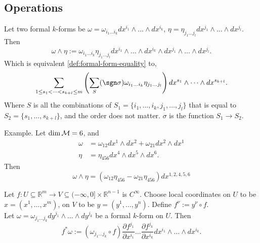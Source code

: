 \documentclass[../main.tex]{subfiles}
\begin{document}
    \subsection{Operations}
    \begin{definition}\label{def:formal-exterior-product}
        Let two formal \(k\)-forms be 
        \(\omega = \omega_{i_1\dots i_k} dx^{i_1} \wedge \dots \wedge dx^{i_k}\), 
        \(\eta = \eta_{j_1\dots j_l} dx^{j_1} \wedge \dots \wedge dx^{j_l}\). Then 
        \[
        \omega\wedge \eta := \omega_{i_1\dots i_k}\eta_{j_1\dots j_l}
        dx^{i_1}\wedge\dots\wedge dx^{i_k} \wedge dx^{j_1} \wedge \dots \wedge 
        dx^{j_l}.
        \]
        Which is equivalent \cref{def:formal-form-equality} to, 
        \[
        \sum_{1 \leq s_1 < \dots < s_{k+l} \leq m}^{} \left(
            \sum_{S}^{} (\sgn\sigma)\omega_{i_1\dots i_k}\eta_{j_1\dots j_l}
        \right)dx^{s_1}\wedge \dots\wedge dx^{s_{k+l}}.
        \]
        Where \(S\) is all the combinations of \(S_1 = \{i_1, \dots, i_k, j_1, \dots, 
        j_l\}\) that is equal to \(S_2 = \{s_1, \dots, s_{k+l}\}\), and the order does 
        not matter. \(\sigma\) is the function \(S_1 \to S_2\).
    \end{definition}
    \begin{remark}
        Example. Let \(\dim \manifold[M]=6\), and 
        \[
        \begin{aligned}
            \omega &= \omega_{12}dx^1\wedge dx^2 + \omega_{21} dx^2 \wedge dx^1 \\
            \eta   &= \eta_{456} dx^4\wedge dx^5\wedge dx^6.
        \end{aligned}
        \]
        Then 
        \[
        \omega\wedge \eta = (\omega_{12}\eta_{456} 
        - \omega_{21}\eta_{456}) dx^{1, 2, 4, 5, 6}
        \]
    \end{remark}
    \begin{definition}[Pullback]\label{def:formal-pullback}
        Let \(f : U \subseteq \mathbb{R}^m \to V \subseteq (-\infty, 0] \times 
        \mathbb{R}^{n-1}\) is \(C^\infty\). Choose local coordinates on 
        \(U\) to be \(x = (x^1, \dots, x^m)\), on \(V\) to be \(y = (y^1, \dots, 
        y^n)\). Define \(f^\nu := y^\nu \circ f\).\\
        Let \(\omega = \omega_{j_1\dots j_k} dy^{j_1}\wedge \dots \wedge dy^{j_k}\) 
        be a formal \(k\)-form on \(U\). Then 
        \[
        f^*\omega := (\omega_{j_1\dots j_k}\circ f)
        \frac{\partial f^{j_1}}{\partial x^{i_1}}\dots
        \frac{\partial f^{j_k}}{\partial x^{i_k}}dx^{i_1}\wedge \dots\wedge dx^{i_k}.
        \]
    \end{definition}
\end{document}
